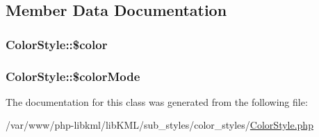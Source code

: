 \subsection{Member Data Documentation}
\hypertarget{classColorStyle_a8022afc3225d8bfd5c6b61950c309808}{
\subsubsection[{\$color}]{\setlength{\rightskip}{0pt plus 5cm}ColorStyle::\$color}}
\label{dd/d0f/classColorStyle_a8022afc3225d8bfd5c6b61950c309808}
\hypertarget{classColorStyle_a8fb0a07eac2cda32814e1f779c97b5a5}{
\subsubsection[{\$colorMode}]{\setlength{\rightskip}{0pt plus 5cm}ColorStyle::\$colorMode}}
\label{dd/d0f/classColorStyle_a8fb0a07eac2cda32814e1f779c97b5a5}


The documentation for this class was generated from the following file:\begin{DoxyCompactItemize}
\item 
/var/www/php-\/libkml/libKML/sub\_\-styles/color\_\-styles/\hyperlink{ColorStyle_8php}{ColorStyle.php}\end{DoxyCompactItemize}
